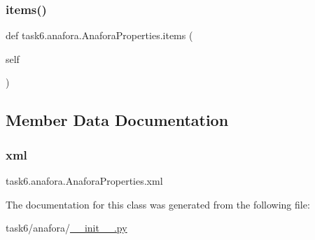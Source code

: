 \subsubsection{\texorpdfstring{items()}{items()}}
{\footnotesize\ttfamily def task6.\+anafora.\+Anafora\+Properties.\+items (\begin{DoxyParamCaption}\item[{}]{self }\end{DoxyParamCaption})}



\subsection{Member Data Documentation}
\mbox{\label{classtask6_1_1anafora_1_1AnaforaProperties_a553884a3cd563f598f3d0d5c5f235561}} 
\subsubsection{\texorpdfstring{xml}{xml}}
{\footnotesize\ttfamily task6.\+anafora.\+Anafora\+Properties.\+xml}



The documentation for this class was generated from the following file\+:\begin{DoxyCompactItemize}
\item 
task6/anafora/\hyperlink{task6_2anafora_2____init_____8py}{\+\_\+\+\_\+init\+\_\+\+\_\+.\+py}\end{DoxyCompactItemize}
